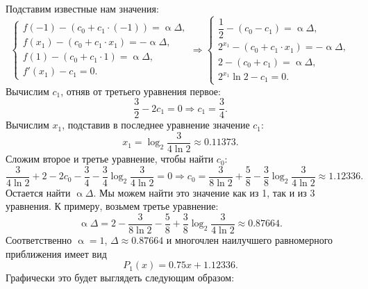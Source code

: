 \documentclass[a4paper, 12pt]{article}
\renewcommand{\alpha}{\upalpha}
\begin{document}
\begin{enumerate}
		Подставим известные нам значения: $$\begin{cases}
			f(-1) - (c_0 + c_1 \cdot (-1)) = \alpha\Delta,\\
			f(x_1) - (c_0 + c_1\cdot x_1) = -\alpha\Delta,\\
			f(1) - (c_0 + c_1 \cdot 1) = \alpha\Delta,\\
			f'(x_1) - c_1 = 0.
		\end{cases}\Rightarrow \begin{cases}
			\dfrac12 - (c_0 - c_1) = \alpha\Delta,\\
			2^{x_1} - (c_0 + c_1\cdot x_1) = -\alpha\Delta,\\
			2 - (c_0 + c_1) = \alpha\Delta,\\
			2^{x_1}\ln2 - c_1 = 0.
		\end{cases}$$
		Вычислим $c_1$, отняв от третьего уравнения первое:
		$$\dfrac{3}{2} - 2c_1 = 0 \Rightarrow c_1 = \dfrac34.$$
		Вычислим $x_1$, подставив в последнее уравнение значение $c_1$:
		$$x_1 = \log_2\dfrac{3}{4\ln 2}\approx 0.11373.$$
		Сложим второе и третье уравнение, чтобы найти $c_0$:
		$$\dfrac{3}{4\ln2} + 2 - 2c_0 - \dfrac34 -\dfrac34 \log_2\dfrac{3}{4\ln 2} = 0 \Rightarrow c_0 = \dfrac{3}{8\ln 2} + \dfrac58 - \dfrac{3}{8}\log_2\dfrac{3}{4\ln 2}\approx 1.12336.$$
		Остается найти $\alpha\Delta$. Мы можем найти это значение как из 1, так и из 3 уравнения. К примеру, возьмем третье уравнение:
		$$\alpha\Delta = 2 - \dfrac{3}{8\ln 2} - \dfrac58 + \dfrac{3}{8}\log_2\dfrac{3}{4\ln 2}\approx 0.87664.$$
		Соответственно $\alpha = 1$, $\Delta \approx 0.87664$ и многочлен наилучшего равномерного приближения имеет вид $$P_1(x) = 0.75x + 1.12336.$$ 
		Графически это будет выглядеть следующим образом:
		\begin{center}\end{center}
	\end{enumerate}
	
\end{document}
